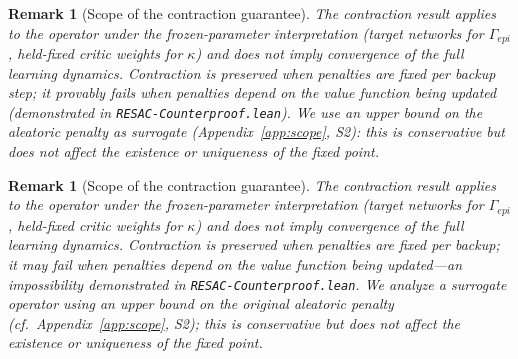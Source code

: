 \documentclass[10pt]{article}
\newtheorem{remark}[theorem]{Remark}
\begin{document}
\begin{remark}[Scope of the contraction guarantee]
    The contraction result applies to the operator under the frozen-parameter interpretation
    (target networks for $\Gamma_{epi}$, held-fixed critic weights for $\kappa$)
    and does not imply convergence of the full learning dynamics.
    Contraction is preserved when penalties are fixed per backup step;
    it provably fails when penalties depend on the value function being updated
    (demonstrated in \texttt{RESAC-Counterproof.lean}).
    We use an upper bound on the aleatoric penalty as surrogate (Appendix~\ref{app:scope}, S2):
    this is conservative but does not affect the existence or uniqueness of the fixed point.
\end{remark}

\begin{remark}[Scope of the contraction guarantee]
    The contraction result applies to the operator under the frozen-parameter interpretation (target networks for $\Gamma_{epi}$, held-fixed critic weights for $\kappa$) and does not imply convergence of the full learning dynamics.
    Contraction is preserved when penalties are fixed per backup; it may fail when penalties depend on the value function being updated---an impossibility demonstrated in \texttt{RESAC-Counterproof.lean}.
    We analyze a surrogate operator using an upper bound on the original aleatoric penalty (cf.\ Appendix~\ref{app:scope}, S2); this is conservative but does not affect the existence or uniqueness of the fixed point.
\end{remark}
\end{document}
